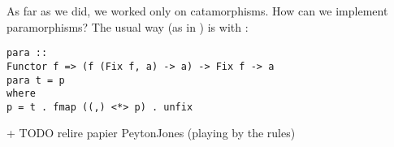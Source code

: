 
As far as we did, we worked only on catamorphisms. How can we implement paramorphisms?
The usual way (as in \cite{ekmett:eschems}) is with :
\begin{verbatim}
para ::
Functor f => (f (Fix f, a) -> a) -> Fix f -> a
para t = p
where
p = t . fmap ((,) <*> p) . unfix
\end{verbatim}
+ TODO relire papier PeytonJones (playing by the rules)